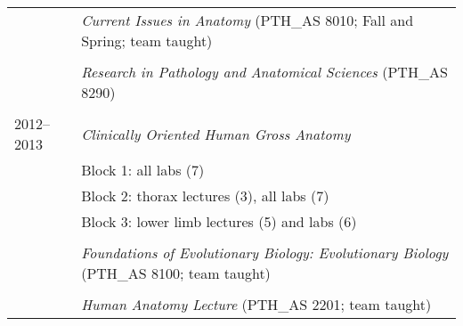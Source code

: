 \begin{longtable}{@{}lX@{}}
    \\
    & \textit{Current Issues in Anatomy} (PTH\_AS 8010; Fall and Spring; team taught)\\
    \\
    & \textit{Research in Pathology and Anatomical Sciences} (PTH\_AS 8290)\\
    \\
  2012--2013 & \textit{Clinically Oriented Human Gross Anatomy}\\
    & Block 1: all labs (7)\\
    & Block 2: thorax lectures (3), all labs (7)\\
    & Block 3: lower limb lectures (5) and labs (6)\\
    \\
    & \textit{Foundations of Evolutionary Biology: Evolutionary Biology} (PTH\_AS 8100; team taught)\\
    \\
    & \textit{Human Anatomy Lecture} (PTH\_AS 2201; team taught)\\
\end{longtable}
